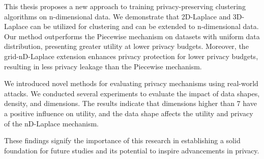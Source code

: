 This thesis proposes a new approach to training privacy-preserving clustering algorithms on n-dimensional data. We demonstrate that 2D-Laplace and 3D-Laplace can be utilized for clustering and can be extended to n-dimensional data. Our method outperforms the Piecewise mechanism on datasets with uniform data distribution, presenting greater utility at lower privacy budgets. Moreover, the grid-nD-Laplace extension enhances privacy protection for lower privacy budgets, resulting in less privacy leakage than the Piecewise mechanism. 

We introduced novel methods for evaluating privacy mechanisms using real-world attacks. We conducted several experiments to evaluate the impact of data shapes, density, and dimensions. The results indicate that dimensions higher than 7 have a positive influence on utility, and the data shape affects the utility and privacy of the nD-Laplace mechanism. 

These findings signify the importance of this research in establishing a solid foundation for future studies and its potential to inspire advancements in privacy.
